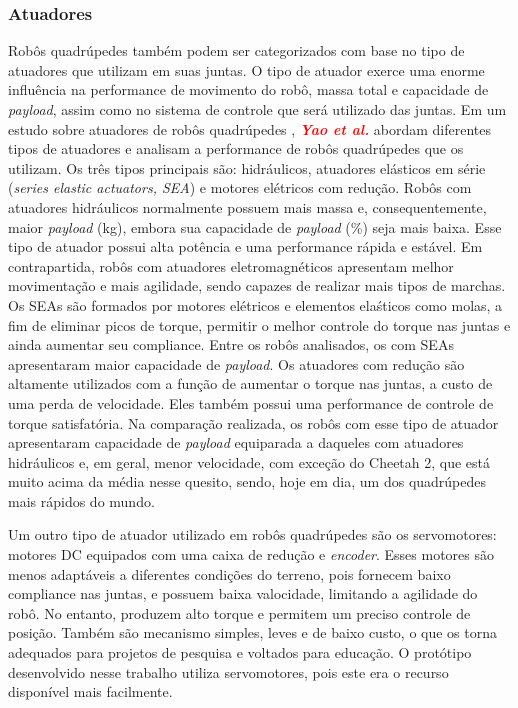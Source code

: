 \documentclass[../main.tex]{subfiles}
\begin{document}
  \subsubsection{Atuadores}
  Robôs quadrúpedes também podem ser categorizados com base no tipo de atuadores que utilizam em suas juntas. O tipo de atuador exerce uma enorme influência na performance de movimento do robô, massa total e capacidade de \textit{payload}, assim como no sistema de controle que será utilizado das juntas. Em um estudo sobre atuadores de robôs quadrúpedes \cite{Yao2021}, \textbf{\textcolor{red}{\textit{Yao et al.}}} abordam diferentes tipos de atuadores e analisam a performance de robôs quadrúpedes que os utilizam. Os três tipos principais são: hidráulicos, atuadores elásticos em série (\textit{series elastic actuators, SEA}) e motores elétricos com redução. Robôs com atuadores hidráulicos normalmente possuem mais massa e, consequentemente, maior \textit{payload} (kg), embora sua capacidade de \textit{payload} (\%) seja mais baixa. Esse tipo de atuador possui alta potência e uma performance rápida e estável. Em contrapartida, robôs com atuadores eletromagnéticos apresentam melhor movimentação e mais agilidade, sendo capazes de realizar mais tipos de marchas. Os SEAs são formados por motores elétricos e elementos elaśticos como molas, a fim de eliminar picos de torque, permitir o melhor controle do torque nas juntas e ainda aumentar seu compliance. Entre os robôs analisados, os com SEAs apresentaram maior capacidade de \textit{payload}. Os atuadores com redução são altamente utilizados com a função de aumentar o torque nas juntas, a custo de uma perda de velocidade. Eles também possui uma performance de controle de torque satisfatória. Na comparação realizada, os robôs com esse tipo de atuador apresentaram capacidade de \textit{payload} equiparada a daqueles com atuadores hidráulicos e, em geral, menor velocidade, com exceção do Cheetah 2, que está muito acima da média nesse quesito, sendo, hoje em dia, um dos quadrúpedes mais rápidos do mundo.

  Um outro tipo de atuador utilizado em robôs quadrúpedes são os servomotores: motores DC equipados com uma caixa de redução e \textit{encoder}. Esses motores são menos adaptáveis a diferentes condições do terreno, pois fornecem baixo compliance nas juntas, e possuem baixa valocidade, limitando a agilidade do robô. No entanto, produzem alto torque e permitem um preciso controle de posição. Também são mecanismo simples, leves e de baixo custo, o que os torna adequados para projetos de pesquisa e voltados para educação. O protótipo desenvolvido nesse trabalho utiliza servomotores, pois este era o recurso disponível mais facilmente.
\end{document}
